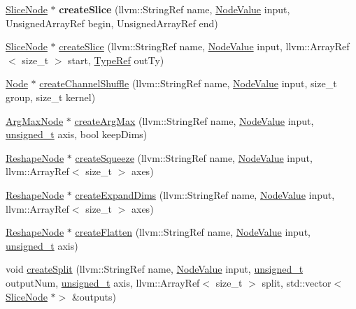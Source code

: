 \begin{DoxyCompactItemize}
\item 
\mbox{\label{classglow_1_1_function_a05b8477dbfb921800443064c03a7ac50}} 
\hyperlink{classglow_1_1_slice_node}{Slice\+Node} $\ast$ {\bfseries create\+Slice} (llvm\+::\+String\+Ref name, \hyperlink{structglow_1_1_node_value}{Node\+Value} input, Unsigned\+Array\+Ref begin, Unsigned\+Array\+Ref end)
\item 
\hyperlink{classglow_1_1_slice_node}{Slice\+Node} $\ast$ \hyperlink{classglow_1_1_function_abdff3f5f232d5db7d7b7529516053964}{create\+Slice} (llvm\+::\+String\+Ref name, \hyperlink{structglow_1_1_node_value}{Node\+Value} input, llvm\+::\+Array\+Ref$<$ size\+\_\+t $>$ start, \hyperlink{structglow_1_1_type}{Type\+Ref} out\+Ty)
\item 
\hyperlink{classglow_1_1_node}{Node} $\ast$ \hyperlink{classglow_1_1_function_a0a16974812ba2aaadd2ec5cf521ef1a0}{create\+Channel\+Shuffle} (llvm\+::\+String\+Ref name, \hyperlink{structglow_1_1_node_value}{Node\+Value} input, size\+\_\+t group, size\+\_\+t kernel)
\item 
\hyperlink{classglow_1_1_arg_max_node}{Arg\+Max\+Node} $\ast$ \hyperlink{classglow_1_1_function_a0dffc1674d4a1654cb7206a4d7752b1e}{create\+Arg\+Max} (llvm\+::\+String\+Ref name, \hyperlink{structglow_1_1_node_value}{Node\+Value} input, \hyperlink{namespaceglow_a0ca574644e1e42ef193a9947fb4d8911}{unsigned\+\_\+t} axis, bool keep\+Dims)
\item 
\hyperlink{classglow_1_1_reshape_node}{Reshape\+Node} $\ast$ \hyperlink{classglow_1_1_function_a5fa046629fa2f742a28a49966c67e947}{create\+Squeeze} (llvm\+::\+String\+Ref name, \hyperlink{structglow_1_1_node_value}{Node\+Value} input, llvm\+::\+Array\+Ref$<$ size\+\_\+t $>$ axes)
\item 
\hyperlink{classglow_1_1_reshape_node}{Reshape\+Node} $\ast$ \hyperlink{classglow_1_1_function_a05272c5de8896a7f0110b620ae8ee3d9}{create\+Expand\+Dims} (llvm\+::\+String\+Ref name, \hyperlink{structglow_1_1_node_value}{Node\+Value} input, llvm\+::\+Array\+Ref$<$ size\+\_\+t $>$ axes)
\item 
\hyperlink{classglow_1_1_reshape_node}{Reshape\+Node} $\ast$ \hyperlink{classglow_1_1_function_a5978750e2f05e9c022756e49e2591830}{create\+Flatten} (llvm\+::\+String\+Ref name, \hyperlink{structglow_1_1_node_value}{Node\+Value} input, \hyperlink{namespaceglow_a0ca574644e1e42ef193a9947fb4d8911}{unsigned\+\_\+t} axis)
\item 
void \hyperlink{classglow_1_1_function_a9f77fd01d257c12ce44d64ee25c9a65f}{create\+Split} (llvm\+::\+String\+Ref name, \hyperlink{structglow_1_1_node_value}{Node\+Value} input, \hyperlink{namespaceglow_a0ca574644e1e42ef193a9947fb4d8911}{unsigned\+\_\+t} output\+Num, \hyperlink{namespaceglow_a0ca574644e1e42ef193a9947fb4d8911}{unsigned\+\_\+t} axis, llvm\+::\+Array\+Ref$<$ size\+\_\+t $>$ split, std\+::vector$<$ \hyperlink{classglow_1_1_slice_node}{Slice\+Node} $\ast$$>$ \&outputs)
$$
\end{DoxyCompactItemize}
